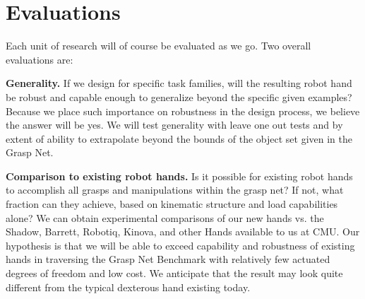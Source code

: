 \section{Evaluations}

Each unit of research will of course be evaluated as we go.  Two overall evaluations are:

\smallskip\noindent
{\bf Generality. }  If we design for specific task families, will the resulting robot hand be robust and capable enough to generalize beyond the specific given examples?   Because we place such importance on robustness in the design process, we believe the answer will be yes.   We will test generality with leave one out tests and by extent of ability to extrapolate beyond the bounds of the object set given in the Grasp Net.

\smallskip\noindent
{\bf  Comparison to existing robot hands.}    Is it possible for existing robot hands to accomplish all grasps and manipulations within the grasp net?   If not, what fraction can they achieve, based on kinematic structure and load capabilities alone?    We can obtain experimental comparisons of our new hands vs. the Shadow, Barrett, Robotiq, Kinova, and other Hands available to us at CMU.   Our hypothesis is that we will be able to exceed capability and robustness of existing hands in traversing the Grasp Net Benchmark with relatively few actuated degrees of freedom and low cost.   We anticipate that the result may look quite different from the typical dexterous hand existing today.

